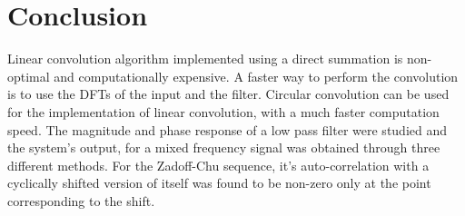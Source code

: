 \documentclass[12pt, a4paper, twoside]{article}
\begin{document}
\section{Conclusion}
Linear convolution algorithm implemented using a direct summation is non-optimal and computationally expensive.  A faster way to perform the convolution is to use the DFTs of the input and the filter.  Circular convolution can be used for the implementation of linear convolution, with a much faster computation speed.  The magnitude and phase response of a low pass filter were studied and the system’s output, for a mixed frequency signal was obtained through three different methods.  For the Zadoff-Chu sequence, it's auto-correlation with a cyclically shifted version of itself was found to be non-zero only at the point corresponding to the shift.
\end{document}
